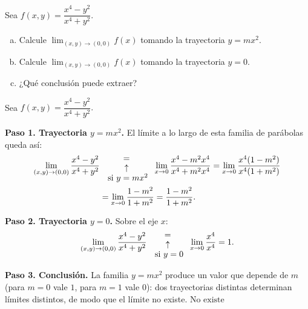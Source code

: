 \begin{prob}
Sea $f(x,y)=\dfrac{x^4-y^2}{x^4+y^2}.$
\begin{enumerate}[(a)]
    \item Calcule $\displaystyle\lim_{(x,y)\to (0,0)}f(x)$ tomando la trayectoria $y=mx^2.$
    \item Calcule $\displaystyle\lim_{(x,y)\to (0,0)}f(x)$ tomando la trayectoria $y=0.$
    \item ¿Qué conclusión puede extraer?
\end{enumerate}
\begin{myproof}
Sea $f(x,y)=\dfrac{x^4-y^2}{x^4+y^2}.$

\textbf{Paso 1. Trayectoria $y=mx^2$.} El límite a lo largo de esta familia de parábolas queda así:
\begin{align*}
\displaystyle\lim_{(x,y)\to (0,0)} \dfrac{x^4-y^2}{x^4+y^2} &{{=}\atop {\begin{array}{c}
\uparrow\\ \text{ si $y=mx^2$}\end{array}} } \displaystyle\lim_{x\to 0}\dfrac{x^4-m^2x^4}{x^4+m^2x^4}=\displaystyle\lim_{x\to 0}\dfrac{x^4(1-m^2)}{x^4(1+m^2)}\\&=\lim_{x\to 0}\dfrac{1-m^2}{1+m^2}=\dfrac{1-m^2}{1+m^2}.
\end{align*}

\textbf{Paso 2. Trayectoria $y=0$.} Sobre el eje $x$:
\begin{align*}
\displaystyle\lim_{(x,y)\to (0,0)} \dfrac{x^4-y^2}{x^4+y^2} {{=}\atop {\begin{array}{c}
\uparrow\\ \text{ si $y=0$}\end{array}} } \displaystyle\lim_{x\to 0}\dfrac{x^4}{x^4}=1.
\end{align*}

\textbf{Paso 3. Conclusión.} La familia $y=mx^2$ produce un valor que depende de $m$ (para $m=0$ vale $1$, para $m=1$ vale $0$): dos trayectorias distintas determinan límites distintos, de modo que el límite no existe.
$\boxed{\text{No existe}}$
\end{myproof}
\end{prob}

